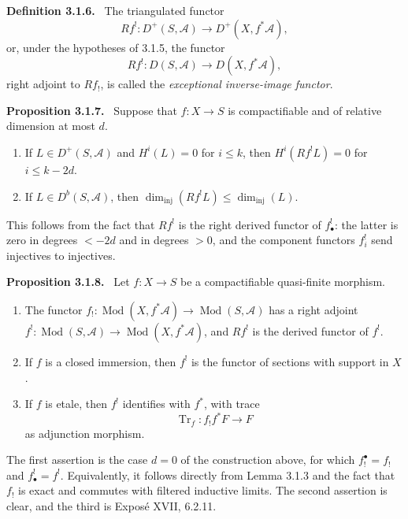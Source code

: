 \documentclass[12pt]{article}
\newcommand{\Aa}{\mathcal A}
\DeclareMathOperator{\Mod}{Mod}
\DeclareMathOperator{\Tr}{Tr}
\newenvironment{statement}[1]{\par\medskip\noindent\textbf{#1.}\ }{\par\medskip}
\begin{document}
\begin{statement}{Definition 3.1.6}
The triangulated functor
\[
   Rf^!:D^+(S,\Aa)\longrightarrow D^+(X,f^*\Aa),
\]
or, under the hypotheses of 3.1.5, the functor
\[
   Rf^!:D(S,\Aa)\longrightarrow D(X,f^*\Aa),
\]
right adjoint to $Rf_!$, is called the \emph{exceptional inverse-image functor}.
\end{statement}

\begin{statement}{Proposition 3.1.7}
Suppose that $f:X\to S$ is compactifiable and of relative dimension at most $d$.
\begin{enumerate}[label=(\roman*)]
\item If $L\in D^+(S,\Aa)$ and $H^i(L)=0$ for $i\leq k$, then $H^i(Rf^!L)=0$ for $i\leq k-2d$.
\item If $L\in D^b(S,\Aa)$, then $\dim_{\mathrm{inj}}(Rf^!L)\leq \dim_{\mathrm{inj}}(L)$.
\end{enumerate}
\end{statement}

This follows from the fact that $Rf^!$ is the right derived functor of $f^!_{\bullet}$: the latter is zero in degrees $<-2d$ and in degrees $>0$, and the component functors $f_i^!$ send injectives to injectives.

\begin{statement}{Proposition 3.1.8}
Let $f:X\to S$ be a compactifiable quasi-finite morphism.
\begin{enumerate}[label=(\roman*)]
\item The functor $f_!:\Mod(X,f^*\Aa)\to \Mod(S,\Aa)$ has a right adjoint $f^!:\Mod(S,\Aa)\to \Mod(X,f^*\Aa)$, and $Rf^!$ is the derived functor of $f^!$.
\item If $f$ is a closed immersion, then $f^!$ is the functor of sections with support in $X$.
\item If $f$ is etale, then $f^!$ identifies with $f^*$, with trace
\[
   \Tr_f:f_!f^*F\longrightarrow F
\]
as adjunction morphism.
\end{enumerate}
\end{statement}

The first assertion is the case $d=0$ of the construction above, for which $f_!^{\bullet}=f_!$ and $f^!_{\bullet}=f^!$. Equivalently, it follows directly from Lemma 3.1.3 and the fact that $f_!$ is exact and commutes with filtered inductive limits. The second assertion is clear, and the third is Expos\'e XVII, 6.2.11.
\end{document}
